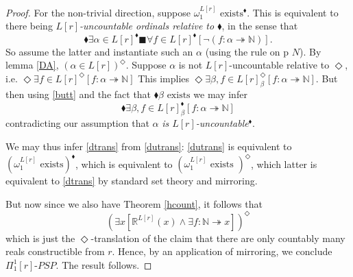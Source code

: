\documentclass{article}
\newcommand\D{\blacklozenge}
\newcommand\B{\blacksquare}
\begin{document}
\begin{proof}
For the non-trivial direction, suppose $\omega_1^{L[r]} \text{ exists}^{\D}$. 
This is equivalent to there being \emph{$L[r]$-uncountable ordinals relative to $\D$}, in the sense that
\[\D \exists \alpha \in L[r]^{\D} \B \forall f \in L[r]^{\D}[\neg(f : \alpha \twoheadrightarrow \mathbb{N})].\]
So assume the latter and instantiate such an $\alpha$ (using the rule on p $N$). 
By lemma \ref{DA}, $(\alpha \in L[r])^\Diamond$. Suppose $\alpha$ is not
$L[r]$-uncountable relative to $\Diamond$, i.e. 
$\Diamond \exists f \in L[r]^\Diamond[f : \alpha \twoheadrightarrow \mathbb{N}]$
This implies 
$\Diamond \exists \beta, f \in L[r]_\beta^\Diamond[f : \alpha \twoheadrightarrow \mathbb{N}]$. 
But then using \eqref{butt} and the fact that $\D \beta \text{ exists}$ we may infer
\[\D \exists \beta, f \in L[r]_\beta^{\D}[f : \alpha \twoheadrightarrow \mathbb{N}]\]
contradicting our assumption that $\alpha$ \emph{is $L[r]$-uncountable}$^{\D}$.

We may thus infer \eqref{dtrans} from \eqref{dutrans}: \eqref{dutrans} is equivalent to 
$(\omega_1^{L[r]} \text{ exists})^{\D}$, which is equivalent to 
$(\omega_1^{L[r]} \text{ exists })^\Diamond$,
which latter is equivalent to \eqref{dtrans} by standard set theory and mirroring. 

But now since we also have Theorem \ref{hcount}, it follows that 
\begin{equation}
    (\exists x[\mathbb{R}^{L[r]}(x) \wedge \exists f : \mathbb{N} \twoheadrightarrow x])^\Diamond
\end{equation}
which is just the $\Diamond$-translation of the claim that there are only countably many 
reals constructible from $r$. Hence, by an application of mirroring, we conclude $\Pi_1^1[r]$-$PSP$.
The result follows.

\end{proof}
\end{document}
